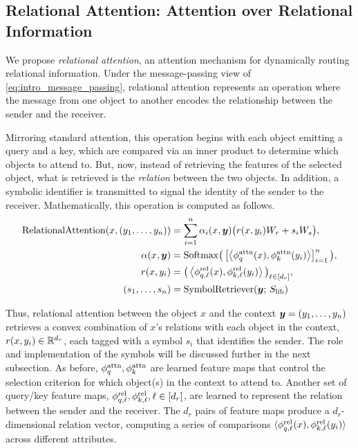 \subsection{Relational Attention: Attention over Relational Information}

We propose \textit{relational attention}, an attention mechanism for dynamically routing relational information. Under the message-passing view of \cref{eq:intro_message_passing}, relational attention represents an operation where the message from one object to another encodes the relationship between the sender and the receiver.

Mirroring standard attention, this operation begins with each object emitting a query and a key, which are compared via an inner product to determine which objects to attend to. But, now, instead of retrieving the features of the selected object, what is retrieved is the \textit{relation} between the two objects. In addition, a symbolic identifier is transmitted to signal the identity of the sender to the receiver. Mathematically, this operation is computed as follows.
\begin{equation}\label{eq:rel_attn}
  \begin{split}
    \mathrm{RelationalAttention}(x, (y_1, \ldots, y_n)) &= \sum_{i=1}^{n} \alpha_i(x, \bm{y}) \big(r(x, y_i) W_r + s_i W_s\big), \\
    \alpha(x, \bm{y}) &= \mathrm{Softmax}\big(\left[\left \langle \phi_q^{\mathrm{attn}}(x), \phi_k^{\mathrm{attn}}(y_i) \right\rangle\right]_{i=1}^{n}\big), \\
    r(x, y_i) &= \big(\left \langle \phi_{q, \ell}^{\mathrm{rel}}(x), \phi_{k, \ell}^{\mathrm{rel}}(y_i) \right\rangle\big)_{\ell \in [d_r]}, \\
    (s_1, \ldots, s_n) &= \mathrm{SymbolRetriever}(\bm{y};\,S_\mathrm{lib})
  \end{split}
\end{equation}

Thus, relational attention between the object $x$ and the context $\bm{y} = (y_1, \ldots, y_n)$ retrieves a convex combination of $x$'s relations with each object in the context, $r(x, y_i) \in \mathbb{R}^{d_r}$, each tagged with a symbol $s_i$ that identifies the sender. The role and implementation of the symbols will be discussed further in the next subsection. As before, $\phi_q^{\mathrm{attn}}, \phi_k^{\mathrm{attn}}$ are learned feature maps that control the selection criterion for which object(s) in the context to attend to. Another set of query/key feature maps, $\phi_{q, \ell}^{\mathrm{rel}}, \phi_{k, \ell}^{\mathrm{rel}}, \ell \in [d_r]$, are learned to represent the relation between the sender and the receiver. The $d_r$ pairs of feature maps produce a $d_r$-dimensional relation vector, computing a series of comparisons $\langle \phi_{q, \ell}^{\mathrm{rel}}(x), \phi_{k, \ell}^{\mathrm{rel}}(y_i) \rangle$ across different attributes.

